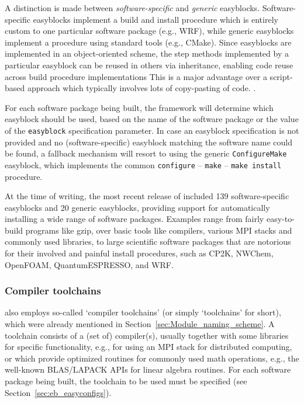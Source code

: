 A distinction is made between \emph{software-specific} and \emph{generic} easyblocks.
Software-specific easyblocks implement a build and install procedure which is
entirely custom to one particular software package (e.g., WRF), while
generic easyblocks implement a procedure using standard tools (e.g., CMake).
Since easyblocks are implemented in an object-oriented scheme,
the step methods implemented by a particular easyblock can be reused in others via
inheritance, enabling code reuse across build procedure implementations
This is a major advantage over a script-based approach which typically involves
lots of copy-pasting of code.
.

For each software package being built, the \easybuild{} framework will determine
which easyblock should be used, based on the name of the software package or the
value of the \texttt{\small easyblock} specification parameter. In case an easyblock
specification is not provided and no (software-specific) easyblock matching the
software name could be found, a fallback mechanism will resort to using the generic
\texttt{\small ConfigureMake} easyblock, which implements the common
\texttt{\small configure} -- \texttt{\small make} -- \texttt{\small make install}
procedure.

At the time of writing, the most recent release of \easybuild{} included 139
software-specific easyblocks and 20 generic easyblocks, providing support for
automatically installing a wide range of software packages. Examples range
from fairly easy-to-build programs like gzip, over basic tools like
compilers, various MPI stacks and commonly used libraries, to large scientific
software packages that are notorious for their involved and painful install
procedures, such as CP2K, NWChem, OpenFOAM, QuantumESPRESSO, and WRF.

\subsubsection{Compiler toolchains}
\label{sec:eb_toolchains}

\easybuild{} also employs so-called `compiler toolchains' (or simply `toolchains'
for short), which were already mentioned in Section~\ref{sec:Module_naming_scheme}.
A toolchain consists of a (set of) compiler(s), usually together with some
libraries for specific functionality, e.g., for using an MPI stack for distributed
computing, or which provide optimized routines for commonly used math operations,
e.g., the well-known BLAS/LAPACK APIs for linear algebra routines. For each software
package being built, the toolchain to be used must be specified
(see Section~\ref{sec:eb_easyconfigs}).

